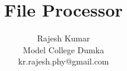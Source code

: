 \documentclass{beamer}
\begin{document}
\title{File Processor}
\author{Rajesh Kumar \\Model College Dumka\\kr.rajesh.phy@gmail.com}
\date{}

\begin{frame}
  \titlepage
\end{frame}


\end{document}

